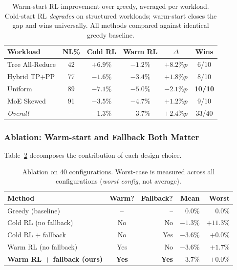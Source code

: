 \begin{table}[t]
\centering
\caption{Warm-start RL improvement over greedy, averaged per workload.
Cold-start RL \emph{degrades} on structured workloads; warm-start closes the
gap and wins universally. All methods compared against identical greedy baseline.}
\label{tab:ml_placement}
\small
\begin{tabular}{lccccc}
\toprule
Workload & NL\% & Cold RL & \textbf{Warm RL} & $\Delta$ & Wins \\
\midrule
Tree All-Reduce & 42 & $+6.9\%$ & $\mathbf{-1.2\%}$ & $+8.2\%\!p$ & 6/10 \\
Hybrid TP+PP    & 77 & $-1.6\%$ & $\mathbf{-3.4\%}$ & $+1.8\%\!p$ & 8/10 \\
Uniform         & 89 & $-7.1\%$ & $\mathbf{-5.0\%}$ & $-2.1\%\!p$ & \textbf{10/10} \\
MoE Skewed      & 91 & $-3.5\%$ & $\mathbf{-4.7\%}$ & $+1.2\%\!p$ & 9/10 \\
\midrule
\emph{Overall}  & -- & $-1.3\%$ & $\mathbf{-3.7\%}$ & $+2.4\%\!p$ & 33/40 \\
\bottomrule
\end{tabular}
\end{table}

\subsubsection{Ablation: Warm-start and Fallback Both Matter}

Table~\ref{tab:ablation} decomposes the contribution of each design choice.

\begin{table}[t]
\centering
\caption{Ablation on 40 configurations. Worst-case is measured across all
configurations (\emph{worst config}, not average).}
\label{tab:ablation}
\small
\begin{tabular}{lcrrr}
\toprule
Method                           & Warm? & Fallback? & Mean    & Worst   \\
\midrule
Greedy (baseline)                & --    & --        & $0.0\%$ & $0.0\%$ \\
Cold RL (no fallback)            & No    & No        & $-1.3\%$ & $+11.3\%$ \\
Cold RL + fallback               & No    & Yes       & $-3.6\%$ & $+0.0\%$ \\
Warm RL (no fallback)            & Yes   & No        & $-3.6\%$ & $+1.7\%$ \\
\textbf{Warm RL + fallback (ours)} & \textbf{Yes} & \textbf{Yes} & $\mathbf{-3.7\%}$ & $\mathbf{+0.0\%}$ \\
\bottomrule
\end{tabular}
\end{table}

